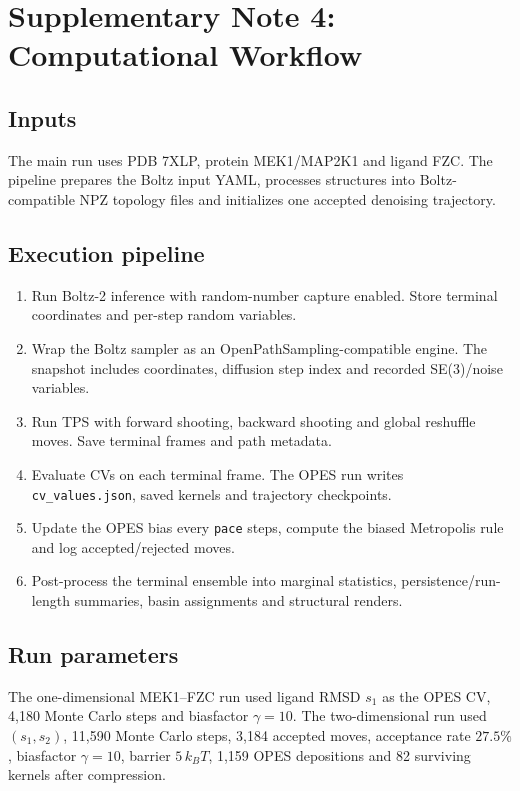 \documentclass[11pt,a4paper]{article}
\begin{document}
\section{Supplementary Note 4: Computational Workflow}
\label{sec:workflow}

\subsection{Inputs}

The main run uses PDB 7XLP, protein MEK1/MAP2K1 and ligand FZC. The pipeline
prepares the Boltz input YAML, processes structures into Boltz-compatible NPZ
topology files and initializes one accepted denoising trajectory.

\subsection{Execution pipeline}

\begin{enumerate}[leftmargin=*]
  \item Run Boltz-2 inference with random-number capture enabled. Store terminal
  coordinates and per-step random variables.
  \item Wrap the Boltz sampler as an OpenPathSampling-compatible engine. The
  snapshot includes coordinates, diffusion step index and recorded SE(3)/noise
  variables.
  \item Run TPS with forward shooting, backward shooting and global reshuffle
  moves. Save terminal frames and path metadata.
  \item Evaluate CVs on each terminal frame. The OPES run writes
  \texttt{cv\_values.json}, saved kernels and trajectory checkpoints.
  \item Update the OPES bias every \texttt{pace} steps, compute the biased
  Metropolis rule and log accepted/rejected moves.
  \item Post-process the terminal ensemble into marginal statistics,
  persistence/run-length summaries, basin assignments and structural renders.
\end{enumerate}

\subsection{Run parameters}

The one-dimensional MEK1--FZC run used ligand RMSD $s_1$ as the OPES CV,
4,180 Monte Carlo steps and biasfactor $\gamma=10$. The two-dimensional run
used $(s_1,s_2)$, 11,590 Monte Carlo steps, 3,184 accepted moves, acceptance
rate $27.5\%$, biasfactor $\gamma=10$, barrier $5\,k_BT$, 1,159 OPES
depositions and 82 surviving kernels after compression.
\end{document}
